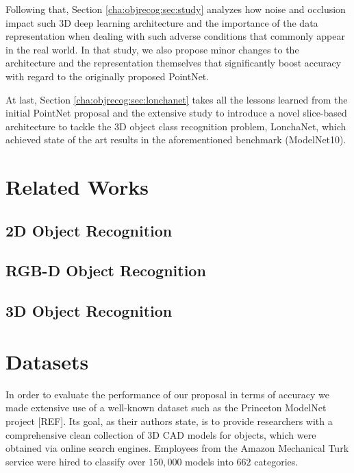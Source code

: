 Following that, Section \ref{cha:objrecog:sec:study} analyzes how noise and occlusion impact such 3D deep learning architecture and the importance of the data representation when dealing with such adverse conditions that commonly appear in the real world. In that study, we also propose minor changes to the architecture and the representation themselves that significantly boost accuracy with regard to the originally proposed PointNet.

At last, Section \ref{cha:objrecog:sec:lonchanet} takes all the lessons learned from the initial PointNet proposal and the extensive study to introduce a novel slice-based architecture to tackle the 3D object class recognition problem, LonchaNet, which achieved state of the art results in the aforementioned benchmark (ModelNet10).

\clearpage

\section{Related Works}
\label{cha:objrecog:sec:relatedworks}

\subsection{2D Object Recognition}
\label{cha:objrecog:sec:relatedworks:subsec:2d}

\subsection{RGB-D Object Recognition}
\label{cha:objrecog:sec:relatedworks:subsec:rgbd}

\subsection{3D Object Recognition}
\label{cha:objrecog:sec:relatedworks:subsec:3d}

\section{Datasets}
\label{cha:objrecog:sec:datasets}


In order to evaluate the performance of our proposal in terms of accuracy we made extensive use of a well-known dataset such as the Princeton ModelNet project [REF]. Its goal, as their authors state, is to provide researchers with a comprehensive clean collection of 3D \ac{CAD} models for objects, which were obtained via online search engines. Employees from the Amazon Mechanical Turk service were hired to classify over $150,000$ models into $662$ categories.

